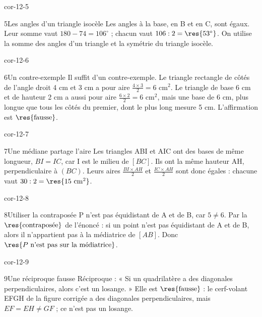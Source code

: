\begin{blocLivre}{cor-12-5}\begin{corrige}{5}{Les angles d’un triangle isocèle}
Les angles à la base, en B et en C, sont égaux. Leur somme vaut $180-74=106^\circ$ ; chacun vaut $106:2=\res{53^\circ}$. On utilise la somme des angles d’un triangle et la symétrie du triangle isocèle.
\label{fig-cor-12-5}
\end{corrige}\end{blocLivre}
\begin{blocLivre}{cor-12-6}\begin{corrige}{6}{Un contre-exemple}
Il suffit d’un contre-exemple. Le triangle rectangle de côtés de l’angle droit 4 cm et 3 cm a pour aire $\frac{4\times3}2=6$ cm$^2$. Le triangle de base 6 cm et de hauteur 2 cm a aussi pour aire $\frac{6\times2}2=6$ cm$^2$, mais une base de 6 cm, plus longue que tous les côtés du premier, dont le plus long mesure 5 cm. L’affirmation est $\res{\text{fausse}}$.
\label{fig-cor-12-6}
\end{corrige}\end{blocLivre}
\begin{blocLivre}{cor-12-7}\begin{corrige}{7}{Une médiane partage l’aire}
Les triangles ABI et AIC ont des bases de même longueur, $BI=IC$, car I est le milieu de $[BC]$. Ils ont la même hauteur AH, perpendiculaire à $(BC)$. Leurs aires $\frac{BI\times AH}2$ et $\frac{IC\times AH}2$ sont donc égales : chacune vaut $30:2=\res{15\ \mathrm{cm}^2}$.
\label{fig-cor-12-7}
\end{corrige}\end{blocLivre}
\begin{blocLivre}{cor-12-8}\begin{corrige}{8}{Utiliser la contraposée}
P n’est pas équidistant de A et de B, car $5\ne6$. Par la $\res{\text{contraposée}}$ de l’énoncé : si un point n’est pas équidistant de A et de B, alors il n’appartient pas à la médiatrice de $[AB]$. Donc $\res{P\text{ n’est pas sur la médiatrice}}$.
\label{fig-cor-12-8}
\end{corrige}\end{blocLivre}
\begin{blocLivre}{cor-12-9}\begin{corrige}{9}{Une réciproque fausse}
Réciproque : « Si un quadrilatère a des diagonales perpendiculaires, alors c’est un losange. » Elle est $\res{\text{fausse}}$ : le cerf-volant EFGH de la figure corrigée a des diagonales perpendiculaires, mais $EF=EH\ne GF$ ; ce n’est pas un losange.
\label{fig-cor-12-9}
\end{corrige}\end{blocLivre}
